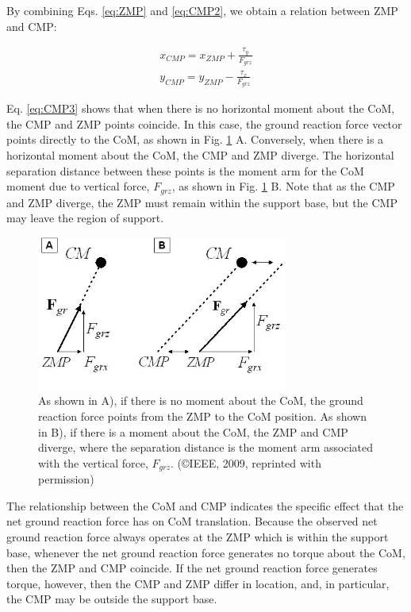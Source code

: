 \documentclass{llncs}
\begin{document}
By combining Eqs. \ref{eq:ZMP} and \ref{eq:CMP2}, we obtain a relation between ZMP and CMP:

\begin{eqnarray}
x_{CMP} = x_{ZMP} + \frac{\tau_y}{F_{grz}}\\
y_{CMP} = y_{ZMP} - \frac{\tau_x}{F_{grz}}
\label{eq:CMP3}
\end{eqnarray}

Eq. \ref{eq:CMP3} shows that when there is no horizontal moment about the CoM, the CMP and ZMP points coincide.  
In this case, the ground reaction force vector points directly to the CoM, as shown in Fig. \ref{fig:Fig1} A.  
Conversely, when there is a horizontal moment about the CoM, the CMP and ZMP diverge.  
The horizontal separation distance between these points is the moment arm for the CoM moment due to vertical force, $F_{grz}$, as shown in Fig. \ref{fig:Fig1} B.  
Note that as the CMP and ZMP diverge, the ZMP must remain within the support base, but the CMP may leave the region of support. 

\begin{figure}%
\includegraphics[height=2in]{Fig1}
\caption{As shown in A), if there is no moment about the CoM, the ground reaction force points from the ZMP to the CoM position.  As shown in  B),  if there is a moment about the CoM, the ZMP and CMP diverge, where the separation distance is the moment arm associated with the vertical force, $F_{grz}$.
(\copyright IEEE, 2009, reprinted with permission)}
\label{fig:Fig1}       
\end{figure}

The relationship between the CoM and CMP indicates the specific effect that the net ground reaction force has on CoM translation. 
Because the observed net ground reaction force always operates at the ZMP which is within the support base, 
whenever the net ground reaction force generates no torque about the CoM, then the ZMP and CMP coincide. 
If the net ground reaction force generates torque, however, then the CMP and ZMP differ in location, and, in particular, the CMP may be outside 
the support base. 
\end{document}
